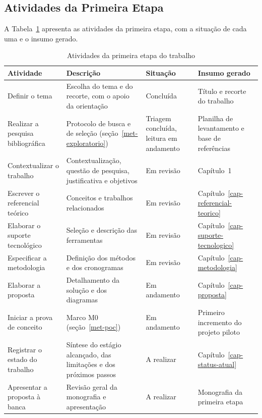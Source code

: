 \subsection{Atividades da Primeira Etapa}
\label{met-etapa1}
\label{met-atividades-primeira-etapa}

A Tabela~\ref{tab-atividades1} apresenta as atividades da primeira etapa, com a situação de cada uma e o insumo gerado.

\begin{table}[htbp]
\centering
\caption{Atividades da primeira etapa do trabalho}
\label{tab-atividades1}
\begingroup
\footnotesize
\SingleSpacing
\setlength{\tabcolsep}{4pt}
\renewcommand{\arraystretch}{1.15}
\begin{tabularx}{\textwidth}{>{\raggedright\arraybackslash}p{3.6cm}>{\raggedright\arraybackslash}X>{\raggedright\arraybackslash}p{2.2cm}>{\raggedright\arraybackslash}p{2.8cm}}
\hline
\textbf{Atividade} & \textbf{Descrição} & \textbf{Situação} & \textbf{Insumo gerado} \\ \hline
Definir o tema & Escolha do tema e do recorte, com o apoio da orientação & Concluída & Título e recorte do trabalho \\ \hline
Realizar a pesquisa bibliográfica & Protocolo de busca e de seleção (seção~\ref{met-exploratorio}) & Triagem concluída, leitura em andamento & Planilha de levantamento e base de referências \\ \hline
Contextualizar o trabalho & Contextualização, questão de pesquisa, justificativa e objetivos & Em revisão & Capítulo~1 \\ \hline
Escrever o referencial teórico & Conceitos e trabalhos relacionados & Em revisão & Capítulo~\ref{cap-referencial-teorico} \\ \hline
Elaborar o suporte tecnológico & Seleção e descrição das ferramentas & Em revisão & Capítulo~\ref{cap-suporte-tecnologico} \\ \hline
Especificar a metodologia & Definição dos métodos e dos cronogramas & Em revisão & Capítulo~\ref{cap-metodologia} \\ \hline
Elaborar a proposta & Detalhamento da solução e dos diagramas & Em andamento & Capítulo~\ref{cap-proposta} \\ \hline
Iniciar a prova de conceito & Marco M0 (seção~\ref{met-poc}) & Em andamento & Primeiro incremento do projeto piloto \\ \hline
Registrar o estado do trabalho & Síntese do estágio alcançado, das limitações e dos próximos passos & A realizar & Capítulo~\ref{cap-status-atual} \\ \hline
Apresentar a proposta à banca & Revisão geral da monografia e apresentação & A realizar & Monografia da primeira etapa \\ \hline
\end{tabularx}
\endgroup
{}
\end{table}

